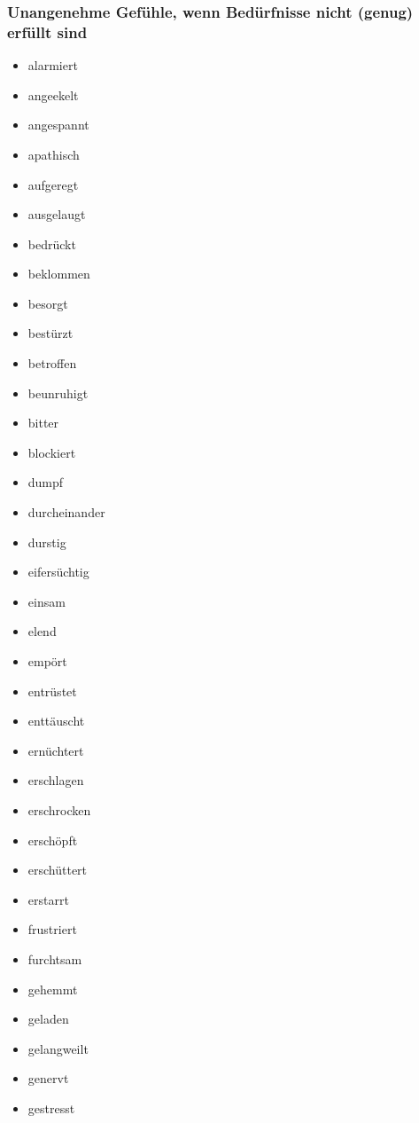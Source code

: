 \subsubsection{Unangenehme Gefühle, wenn Bedürfnisse nicht (genug) erfüllt sind}
\label{unangenehme-gefuehle}

\begin{multicols}{2}
  \begin{itemize}
    \item alarmiert
    \item angeekelt
    \item angespannt
    \item apathisch
    \item aufgeregt
    \item ausgelaugt
    \item bedrückt
    \item beklommen
    \item besorgt
    \item bestürzt
    \item betroffen
    \item beunruhigt
    \item bitter
    \item blockiert
    \item dumpf
    \item durcheinander
    \item durstig
    \item eifersüchtig
    \item einsam
    \item elend
    \item empört
    \item entrüstet
    \item enttäuscht
    \item ernüchtert
    \item erschlagen
    \item erschrocken
    \item erschöpft
    \item erschüttert
    \item erstarrt
    \item frustriert
    \item furchtsam
    \item gehemmt
    \item geladen
    \item gelangweilt
    \item genervt
    \item gestresst

\end{itemize}
\end{multicols}
